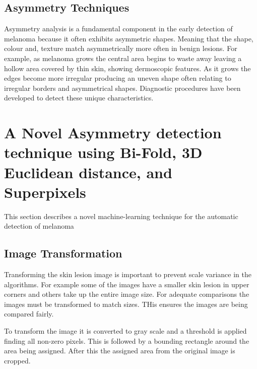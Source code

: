 \subsection{Asymmetry Techniques}
Asymmetry analysis is a fundamental component in the early detection of melanoma because it often exhibits asymmetric shapes\cite{Ali2020a}. Meaning that the shape, colour and, texture match asymmetrically more often in benign lesions. For example, as melanoma grows the central area begins to waste away leaving a hollow area covered by thin skin, showing dermoscopic features. As it grows the edges become more irregular producing an uneven shape often relating to irregular borders and asymmetrical shapes. Diagnostic procedures have been developed to detect these unique characteristics.

\begin{figure}
    \centering
    \caption{} 
\end{figure}\label{asy-examples}


\section{A Novel Asymmetry detection technique using Bi-Fold, 3D Euclidean distance, and Superpixels}
This section describes a novel machine-learning technique for the automatic detection of melanoma

\subsection{Image Transformation}
Transforming the skin lesion image is important to prevent scale variance in the algorithms. For example some of the images have a smaller skin lesion in upper corners and others take up the entire image size. For adequate comparisons the images must be transformed to match sizes. THis ensures the images are being compared fairly.

To transform the image it is converted to gray scale and a threshold is applied finding all non-zero pixels. This is followed by a bounding rectangle around the area being assigned. After this the assigned area from the original image is cropped.

